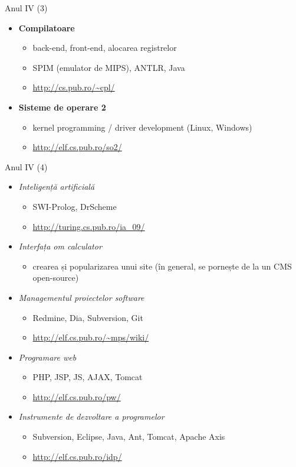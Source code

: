\documentclass{beamer}
\begin{document}
\begin{frame}{Anul IV (3)}
	\begin{itemize}
		\item \textbf{Compilatoare}
			\begin{itemize}
				\item back-end, front-end, alocarea registrelor
				\item SPIM (emulator de MIPS), ANTLR, Java
				\item \url{http://cs.pub.ro/~cpl/}
			\end{itemize}
		\item \textbf{Sisteme de operare 2}
			\begin{itemize}
				\item kernel programming / driver development (Linux, Windows)
				\item \url{http://elf.cs.pub.ro/so2/}
			\end{itemize}
	\end{itemize}
\end{frame}

\begin{frame}{Anul IV (4)}
	\begin{itemize}
		\item \textit{Inteligență artificială}
			\begin{itemize}
				\item SWI-Prolog, DrScheme
				\item \url{http://turing.cs.pub.ro/ia_09/}
			\end{itemize}
		\item \textit{Interfața om calculator}
			\begin{itemize}
				\item crearea și popularizarea unui site (în general, se
				pornește de la un CMS open-source)
			\end{itemize}
		\item \textit{Managementul proiectelor software}
			\begin{itemize}
				\item Redmine, Dia, Subversion, Git
				\item \url{http://elf.cs.pub.ro/~mps/wiki/}
			\end{itemize}
		\item \textit{Programare web}
			\begin{itemize}
				\item PHP, JSP, JS, AJAX, Tomcat
				\item \url{http://elf.cs.pub.ro/pw/}
			\end{itemize}
		\item \textit{Instrumente de dezvoltare a programelor}
			\begin{itemize}
				\item Subversion, Eclipse, Java, Ant, Tomcat, Apache Axis
				\item \url{http://elf.cs.pub.ro/idp/}
			\end{itemize}
	\end{itemize}
\end{frame}
\end{document}
